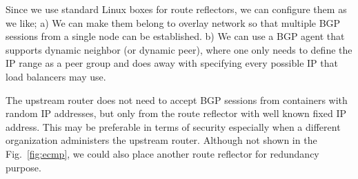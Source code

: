 Since we use standard Linux boxes for route reflectors, we can configure them as we like;
a) We can make them belong to overlay network so that multiple BGP sessions from a single node can be established.
b) We can use a BGP agent that supports dynamic neighbor (or dynamic peer), where one only needs to define the IP range as a peer group and does away with specifying every possible IP that load balancers may use.

The upstream router does not need to accept BGP sessions from containers with random IP addresses, but only from the route reflector with well known fixed IP address. This may be preferable in terms of security especially when a different organization administers the upstream router.
Although not shown in the Fig.~\ref{fig:ecmp}, we could also place another route reflector for redundancy purpose.


\FloatBarrier


